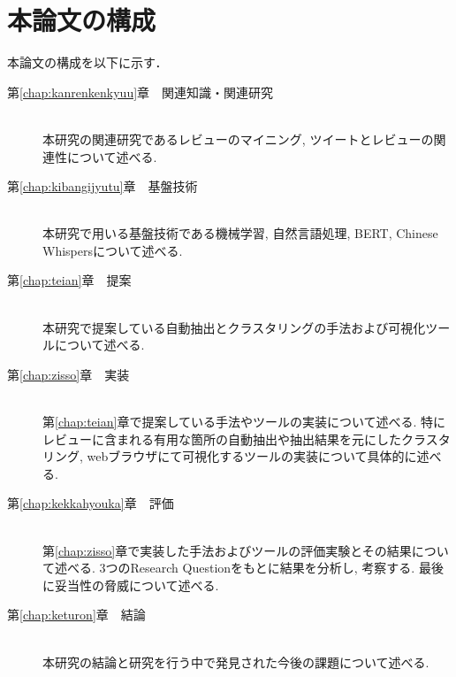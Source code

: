 \section{本論文の構成}
本論文の構成を以下に示す．
\begin{description}

\item[第\ref{chap:kanrenkenkyuu}章　関連知識・関連研究]\mbox{}\\
本研究の関連研究であるレビューのマイニング, ツイートとレビューの関連性について述べる. \\

\item[第\ref{chap:kibangijyutu}章　基盤技術]\mbox{}\\
本研究で用いる基盤技術である機械学習, 自然言語処理, BERT, Chinese Whispersについて述べる. \\

\item[第\ref{chap:teian}章　提案]\mbox{}\\
本研究で提案している自動抽出とクラスタリングの手法および可視化ツールについて述べる. \\

\item[第\ref{chap:zisso}章　実装]\mbox{}\\
第\ref{chap:teian}章で提案している手法やツールの実装について述べる. 特にレビューに含まれる有用な箇所の自動抽出や抽出結果を元にしたクラスタリング, webブラウザにて可視化するツールの実装について具体的に述べる. \\

\item[第\ref{chap:kekkahyouka}章　評価]\mbox{}\\
第\ref{chap:zisso}章で実装した手法およびツールの評価実験とその結果について述べる. 3つのResearch Questionをもとに結果を分析し, 考察する. 最後に妥当性の脅威について述べる. \\

\item[第\ref{chap:keturon}章　結論]\mbox{}\\
本研究の結論と研究を行う中で発見された今後の課題について述べる. \\

\end{description}